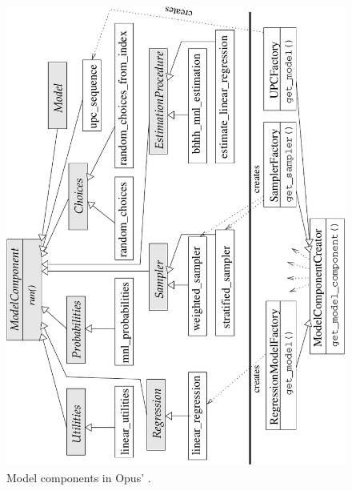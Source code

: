 {\begin{figure}[t]
\begin{center}
\includegraphics[scale=0.8, angle=-90]{images/corecomponents.pdf}
\caption{\label{fig:model-components}\small Model components in Opus' .}

\end{center}
\end{figure}}
